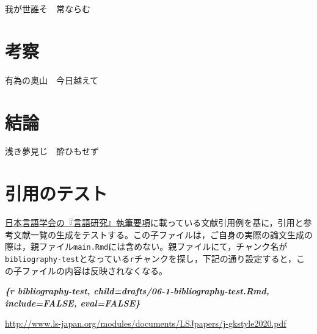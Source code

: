 \documentclass[
  pandoc,
  jafont = haranoaji,
  a4paper,
  everyparhook = compat,
  japaram = {units = true}]{bxjsarticle}
\newenvironment{Shaded}{\begin{snugshade}}{\end{snugshade}}
\newcommand{\InformationTok}[1]{\textcolor[rgb]{0.00,0.40,1.00}{\textbf{\textit{#1}}}}
\begin{document}
我が世誰そ　常ならむ

\hypertarget{ux8003ux5bdf}{%
\section{考察}\label{ux8003ux5bdf}}

有為の奥山　今日越えて

\hypertarget{ux7d50ux8ad6}{%
\section{結論}\label{ux7d50ux8ad6}}

浅き夢見じ　酔ひもせず

\hypertarget{ux5f15ux7528ux306eux30c6ux30b9ux30c8}{%
\section{引用のテスト}\label{ux5f15ux7528ux306eux30c6ux30b9ux30c8}}

\href{http://www.ls-japan.org/modules/documents/LSJpapers/j-gkstyle2020.pdf}{日本言語学会の『言語研究』執筆要項}に載っている文献引用例を基に，引用と参考文献一覧の生成をテストする。この子ファイルは，ご自身の実際の論文生成の際は，親ファイル\texttt{main.Rmd}には含めない。親ファイルにて，チャンク名が\texttt{bibliography-test}となっている\texttt{r}チャンクを探し，下記の通り設定すると，この子ファイルの内容は反映されなくなる。

\begin{Shaded}
\begin{Highlighting}[]
\InformationTok{\textasciigrave{}\textasciigrave{}\textasciigrave{}\{r bibliography{-}test, child=\textquotesingle{}drafts/06{-}1{-}bibliography{-}test.Rmd\textquotesingle{}, include=FALSE, eval=FALSE\}}
\InformationTok{\textasciigrave{}\textasciigrave{}\textasciigrave{}}
\end{Highlighting}
\end{Shaded}

\url{http://www.ls-japan.org/modules/documents/LSJpapers/j-gkstyle2020.pdf}

\textcite{佐久間1941}

\textcite{服部1976}

\textcite{金田一1955}

\textcite{上野1997}

\textcite{柴谷1978}

\textcite{林_南1974}

\textcite{梶1992}
\end{document}
